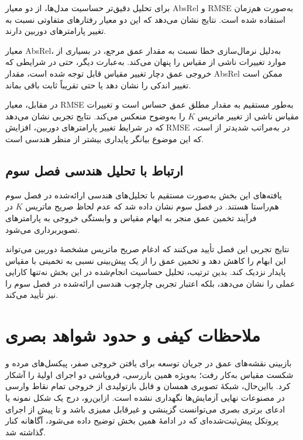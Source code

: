 برای تحلیل دقیق‌تر حساسیت مدل‌ها،
از دو معیار AbsRel و RMSE
به‌صورت هم‌زمان استفاده شده است.
نتایج نشان می‌دهد که این دو معیار
رفتارهای متفاوتی نسبت به تغییر پارامترهای دوربین دارند.

معیار AbsRel،
به‌دلیل نرمال‌سازی خطا نسبت به مقدار عمق مرجع،
در بسیاری از موارد تغییرات ناشی از مقیاس
را پنهان می‌کند.
به‌عبارت دیگر،
حتی در شرایطی که خروجی عمق
دچار تغییر مقیاس قابل توجه شده است،
مقدار AbsRel ممکن است
تغییر اندکی را نشان دهد
یا حتی تقریباً ثابت باقی بماند.

در مقابل،
معیار RMSE
به‌طور مستقیم به مقدار مطلق عمق حساس است
و تغییرات مقیاس ناشی از تغییر ماتریس $K$
را به‌وضوح منعکس می‌کند.
نتایج تجربی نشان می‌دهد که
در شرایط تغییر پارامترهای دوربین،
افزایش RMSE در \basemodel{}
به‌مراتب شدیدتر از \proposedmodel{} است،
که این موضوع بیانگر
پایداری بیشتر \proposedmodel{}
از منظر هندسی است.

\subsection{ارتباط با تحلیل هندسی فصل سوم}
\label{subsec:geometry_link}

یافته‌های این بخش
به‌صورت مستقیم با تحلیل‌های هندسی
ارائه‌شده در فصل سوم هم‌راستا هستند.
در فصل سوم نشان داده شد که
عدم لحاظ صریح ماتریس $K$
در فرآیند تخمین عمق
منجر به ابهام مقیاس
و وابستگی خروجی به پارامترهای تصویربرداری می‌شود.

نتایج تجربی این فصل تأیید می‌کنند که
ادغام صریح ماتریس مشخصهٔ دوربین
می‌تواند این ابهام را کاهش دهد
و تخمین عمق را از یک پیش‌بینی نسبی
به تخمینی با مقیاس پایدار نزدیک کند.
بدین ترتیب،
تحلیل حساسیت انجام‌شده در این بخش
نه‌تنها کارایی عملی \proposedmodel{} را نشان می‌دهد،
بلکه اعتبار تجربی
چارچوب هندسی ارائه‌شده در فصل سوم
را نیز تأیید می‌کند.

\section{ملاحظات کیفی و حدود شواهد بصری}
\label{sec:qualitative_results}

بازبینی نقشه‌های عمق در جریان توسعه برای یافتن خروجی صفر، پیکسل‌های مرده و شکست مقیاس به‌کار رفت؛ به‌ویژه همین بازرسی، فروپاشی دو اجرای اولیهٔ  را آشکار کرد. بااین‌حال، شبکهٔ تصویری همسان و قابل بازتولیدی از خروجی تمام نقاط وارسی در مصنوعات نهایی آزمایش‌ها نگهداری نشده است. ازاین‌رو، درج یک شکل نمونه یا ادعای برتری بصری می‌توانست گزینشی و غیرقابل ممیزی باشد و تا پیش از اجرای پروتکل پیش‌ثبت‌شده‌ای که در ادامهٔ همین بخش توضیح داده می‌شود، آگاهانه کنار گذاشته شد.


